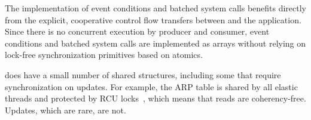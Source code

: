 The implementation of event conditions and batched system calls
benefits directly from the explicit, cooperative control flow
transfers between \ix and the application.  Since there is no concurrent
execution by producer and consumer, event conditions and batched
system calls are implemented as arrays without relying on lock-free
synchronization primitives based on atomics. 


\ix does have a small number of shared structures, including some that
require synchronization on updates.  For example, the ARP table is
shared by all elastic threads and protected by RCU
locks~\cite{mckenney1998read}, which means that reads are
coherency-free.  Updates, which are rare, are not.


